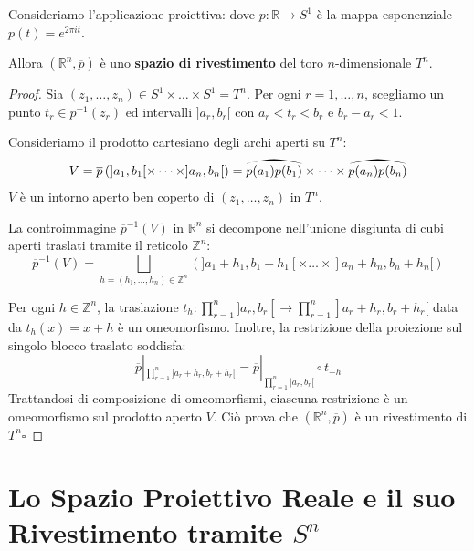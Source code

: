 \begin{ejemplo}
Consideriamo l'applicazione proiettiva:
dove $p: \mathbb{R} \to S^1$ è la mappa esponenziale $p(t) = e^{2\pi i t}$.

Allora $(\mathbb{R}^n, \overline{p})$ è uno \textbf{spazio di rivestimento} del toro $n$-dimensionale $T^n$.

\begin{proof}
Sia $(z_1, \dots, z_n) \in S^1 \times \dots \times S^1 = T^n$.
Per ogni $r = 1, \dots, n$, scegliamo un punto $t_r \in p^{-1}(z_r)$ ed intervalli $]a_r, b_r[$ con $a_r < t_r < b_r$ e $b_r - a_r < 1$.

Consideriamo il prodotto cartesiano degli archi aperti su $T^n$:
\[
V = \overline{p}\left( ]a_1, b_1[ \times \dots \times ]a_n, b_n[ \right) = \widearc{p(a_1)p(b_1)} \times \dots \times \widearc{p(a_n)p(b_n)}
\]
$V$ è un intorno aperto ben coperto di $(z_1, \dots, z_n)$ in $T^n$.

La controimmagine $\overline{p}^{-1}(V)$ in $\mathbb{R}^n$ si decompone nell'unione disgiunta di cubi aperti traslati tramite il reticolo $\mathbb{Z}^n$:
\[
\overline{p}^{-1}(V) = \bigsqcup_{h = (h_1, \dots, h_n) \in \mathbb{Z}^n} \left( ]a_1 + h_1, b_1 + h_1[ \times \dots \times ]a_n + h_n, b_n + h_n[ \right)
\]

Per ogni $h \in \mathbb{Z}^n$, la traslazione $t_h: \prod_{r=1}^n ]a_r, b_r[ \to \prod_{r=1}^n ]a_r + h_r, b_r + h_r[$ data da $t_h(x) = x + h$ è un omeomorfismo.
Inoltre, la restrizione della proiezione sul singolo blocco traslato soddisfa:
\[
\overline{p}|_{\prod_{r=1}^n ]a_r + h_r, b_r + h_r[} = \overline{p}|_{\prod_{r=1}^n ]a_r, b_r[} \circ t_{-h}
\]
Trattandosi di composizione di omeomorfismi, ciascuna restrizione è un omeomorfismo sul prodotto aperto $V$.
Ciò prova che $(\mathbb{R}^n, \overline{p})$ è un rivestimento di $T^n$\hfill$\square$
\end{proof}
\end{ejemplo}

\vspace{2em}

\section{Lo Spazio Proiettivo Reale e il suo Rivestimento tramite $S^n$}

